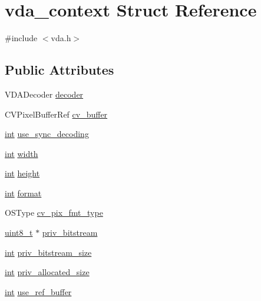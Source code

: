 \hypertarget{structvda__context}{}\section{vda\+\_\+context Struct Reference}
\label{structvda__context}


{\ttfamily \#include $<$vda.\+h$>$}

\subsection*{Public Attributes}
\begin{DoxyCompactItemize}
\item 
V\+D\+A\+Decoder \hyperlink{structvda__context_a760651dcebd505fd9a4cdea29db99ebf}{decoder}
\item 
C\+V\+Pixel\+Buffer\+Ref \hyperlink{structvda__context_af7d84ca967ed9591e45c036e7c579a6f}{cv\+\_\+buffer}
\item 
\hyperlink{xmltok_8h_a5a0d4a5641ce434f1d23533f2b2e6653}{int} \hyperlink{structvda__context_a76a944387b0dfe2b1b690ff4ad9f646a}{use\+\_\+sync\+\_\+decoding}
\item 
\hyperlink{xmltok_8h_a5a0d4a5641ce434f1d23533f2b2e6653}{int} \hyperlink{structvda__context_a1f8c3055063a3492f0066766930fbce9}{width}
\item 
\hyperlink{xmltok_8h_a5a0d4a5641ce434f1d23533f2b2e6653}{int} \hyperlink{structvda__context_aa404ef10a896b154cd41829be525d0e3}{height}
\item 
\hyperlink{xmltok_8h_a5a0d4a5641ce434f1d23533f2b2e6653}{int} \hyperlink{structvda__context_a0ea444e176f930513b19de5e0468ab0f}{format}
\item 
O\+S\+Type \hyperlink{structvda__context_aceddeda581e0e4757ca20bff6fa75883}{cv\+\_\+pix\+\_\+fmt\+\_\+type}
\item 
\hyperlink{lib-src_2ffmpeg_2win32_2stdint_8h_a9a941819355e6f658991890ff66b4b0e}{uint8\+\_\+t} $\ast$ \hyperlink{structvda__context_a46bbc8f32ea0b46e98e04bfa3a15a141}{priv\+\_\+bitstream}
\item 
\hyperlink{xmltok_8h_a5a0d4a5641ce434f1d23533f2b2e6653}{int} \hyperlink{structvda__context_a625ea817b807502f9fbf764c882b1bf7}{priv\+\_\+bitstream\+\_\+size}
\item 
\hyperlink{xmltok_8h_a5a0d4a5641ce434f1d23533f2b2e6653}{int} \hyperlink{structvda__context_a4c3ea7e9a9286d2579f41915337fe229}{priv\+\_\+allocated\+\_\+size}
\item 
\hyperlink{xmltok_8h_a5a0d4a5641ce434f1d23533f2b2e6653}{int} \hyperlink{structvda__context_a59cd6ad473ff9041df27a7fd92dd6b5d}{use\+\_\+ref\+\_\+buffer}
\end{DoxyCompactItemize}


